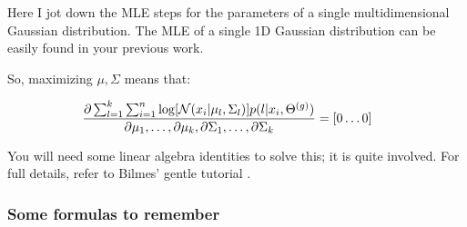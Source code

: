 \documentclass{article}
\begin{document}
Here I jot down the MLE steps for the parameters of a single multidimensional Gaussian distribution. The MLE of a single 1D Gaussian distribution can be easily found in your previous work.

So, maximizing $\mu, \Sigma$ means that:

\begin{equation}
\begin{split}
\frac{\partial \sum_{l=1}^k  \sum_{i=1}^{n}  \log [\mathcal{N}(x_i | \mu_{l}, \Sigma_{l} )] p(l|x_i,\Theta^{(g)}) }
{\partial \mu_1, \dots, \partial \mu_k, \partial \Sigma_1, \dots, \partial \Sigma_k } = [ 0 \dots 0 ] \hspace{5 mm}\\
\end{split}
\end{equation}

You will need some linear algebra identities to solve this; it is quite involved. For full details, refer to Bilmes' gentle tutorial \cite{bilmes1998gentle}.





\subsubsection{Some formulas to remember}
\end{document}
